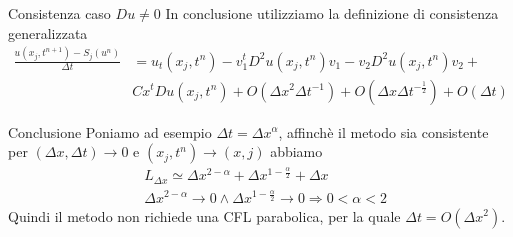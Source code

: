 \begin{frame}{Consistenza caso $Du\neq 0$}
In conclusione utilizziamo la definizione di consistenza generalizzata
\[
\begin{aligned}
\frac{u(x_j,t^{n+1})-S_j(u^n)}{\Delta
  t}&=u_t(x_j,t^n)-v_1^tD^2u(x_j,t^n)v_1-v_2D^2u(x_j,t^n)v_2+\\
& Cx^tDu(x_j,t^n)+O(\Delta x^2\Delta t^{-1})+O(\Delta x\Delta
t^{-\frac{1}{2}})+O(\Delta t)
\end{aligned}
\]
\begin{alertblock}{Conclusione}
Poniamo ad esempio $\Delta t=\Delta x^{\alpha}$, affinchè il metodo
sia consistente per $(\Delta x,\Delta t)\to 0$ e $(x_j,t^n)\to (x,j)$
abbiamo 
\[
\begin{aligned}
&L_{\Delta x}\simeq\Delta x^{2-\alpha}+\Delta
x^{1-\frac{\alpha}{2}}+\Delta x \\
&\Delta x^{2-\alpha}\to 0\land\Delta x^{1-\frac{\alpha}{2}}\to 0\Rightarrow0<\alpha<2
\end{aligned}
\]
Quindi il metodo non richiede una CFL parabolica, per la quale
$\Delta t=O(\Delta x^2)$.
\end{alertblock}
\end{frame}

